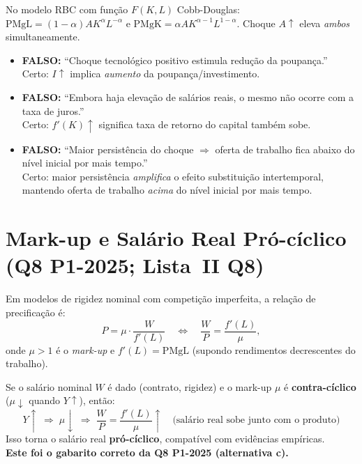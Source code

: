\documentclass[12pt, a4paper]{article}
\begin{document}
\begin{formulabox}[title={Resultado-chave: $f'(K)\uparrow$ implica $I\uparrow$ e $w\uparrow$}]
No modelo RBC com função $F(K,L)$ Cobb-Douglas: $\text{PMgL} = (1-\alpha)AK^\alpha L^{-\alpha}$ e $\text{PMgK} = \alpha AK^{\alpha-1}L^{1-\alpha}$. Choque $A\uparrow$ eleva \emph{ambos} simultaneamente.
\end{formulabox}

\begin{armbox}[title={Armadilhas (Q7)}]
\begin{itemize}[leftmargin=*]
  \item \textbf{FALSO:} ``Choque tecnológico positivo estimula redução da poupança.'' \\ Certo: $I\uparrow$ implica \emph{aumento} da poupança/investimento.
  \item \textbf{FALSO:} ``Embora haja elevação de salários reais, o mesmo não ocorre com a taxa de juros.'' \\ Certo: $f'(K)\uparrow$ significa taxa de retorno do capital também sobe.
  \item \textbf{FALSO:} ``Maior persistência do choque $\Rightarrow$ oferta de trabalho fica abaixo do nível inicial por mais tempo.'' \\ Certo: maior persistência \emph{amplifica} o efeito substituição intertemporal, mantendo oferta de trabalho \emph{acima} do nível inicial por mais tempo.
\end{itemize}
\end{armbox}

\section{Mark-up e Salário Real Pró-cíclico (Q8 P1-2025; Lista~II Q8)}

Em modelos de rigidez nominal com competição imperfeita, a relação de precificação é:
\[
  P = \mu \cdot \frac{W}{f'(L)} \quad\Longleftrightarrow\quad \frac{W}{P} = \frac{f'(L)}{\mu},
\]
onde $\mu > 1$ é o \emph{mark-up} e $f'(L) = \text{PMgL}$ (supondo rendimentos decrescentes do trabalho).

\begin{fatorbox}[title={Condição para salário real pró-cíclico}]
Se o salário nominal $W$ é dado (contrato, rigidez) e o mark-up $\mu$ é \textbf{contra-cíclico} ($\mu\downarrow$ quando $Y\uparrow$), então:
\[
  Y\uparrow \;\Rightarrow\; \mu\downarrow \;\Rightarrow\; \frac{W}{P} = \frac{f'(L)}{\mu}\uparrow \quad \text{(salário real sobe junto com o produto)}
\]
Isso torna o salário real \textbf{pró-cíclico}, compatível com evidências empíricas. \\
\textbf{Este foi o gabarito correto da Q8 P1-2025 (alternativa c).}
\end{fatorbox}
\end{document}
